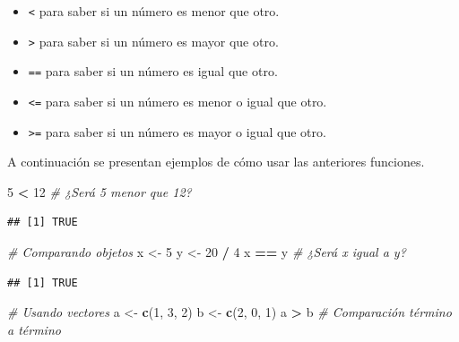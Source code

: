 \documentclass[10pt,]{krantz}
\makeatletter
\newenvironment{Shaded}{\begin{snugshade}}{\end{snugshade}}
\newcommand{\KeywordTok}[1]{\textcolor[rgb]{0.13,0.29,0.53}{\textbf{#1}}}
\newcommand{\DecValTok}[1]{\textcolor[rgb]{0.00,0.00,0.81}{#1}}
\newcommand{\StringTok}[1]{\textcolor[rgb]{0.31,0.60,0.02}{#1}}
\newcommand{\CommentTok}[1]{\textcolor[rgb]{0.56,0.35,0.01}{\textit{#1}}}
\newcommand{\OperatorTok}[1]{\textcolor[rgb]{0.81,0.36,0.00}{\textbf{#1}}}
\newcommand{\NormalTok}[1]{#1}
\providecommand{\tightlist}{%
  \setlength{\itemsep}{0pt}\setlength{\parskip}{0pt}}
\newenvironment{kframe}{%
\medskip{}
\setlength{\fboxsep}{.8em}
 \def\at@end@of@kframe{}%
 \ifinner\ifhmode%
  \def\at@end@of@kframe{\end{minipage}}%
  \begin{minipage}{\columnwidth}%
 \fi\fi%
 \def\FrameCommand##1{\hskip\@totalleftmargin \hskip-\fboxsep
 \colorbox{shadecolor}{##1}\hskip-\fboxsep
     \hskip-\linewidth \hskip-\@totalleftmargin \hskip\columnwidth}%
 \MakeFramed {\advance\hsize-\width
   \@totalleftmargin\z@ \linewidth\hsize
   \@setminipage}}%
 {\par\unskip\endMakeFramed%
 \at@end@of@kframe}
\renewenvironment{Shaded}{\begin{kframe}}{\end{kframe}}
\makeatother
\begin{document}
\begin{itemize}
\tightlist
\item
  \texttt{\textless{}} para saber si un número es menor que otro.
\item
  \texttt{\textgreater{}} para saber si un número es mayor que otro.
\item
  \texttt{==} para saber si un número es igual que otro.
\item
  \texttt{\textless{}=} para saber si un número es menor o igual que
  otro.
\item
  \texttt{\textgreater{}=} para saber si un número es mayor o igual que
  otro.
\end{itemize}

A continuación se presentan ejemplos de cómo usar las anteriores
funciones.

\begin{Shaded}
\begin{Highlighting}[]
\DecValTok{5} \OperatorTok{<}\StringTok{ }\DecValTok{12}  \CommentTok{# ¿Será 5 menor que 12?}
\end{Highlighting}
\end{Shaded}

\begin{verbatim}
## [1] TRUE
\end{verbatim}

\begin{Shaded}
\begin{Highlighting}[]
\CommentTok{# Comparando objetos}
\NormalTok{x <-}\StringTok{ }\DecValTok{5}
\NormalTok{y <-}\StringTok{ }\DecValTok{20} \OperatorTok{/}\StringTok{ }\DecValTok{4}
\NormalTok{x }\OperatorTok{==}\StringTok{ }\NormalTok{y  }\CommentTok{# ¿Será x igual a y?}
\end{Highlighting}
\end{Shaded}

\begin{verbatim}
## [1] TRUE
\end{verbatim}

\begin{Shaded}
\begin{Highlighting}[]
\CommentTok{# Usando vectores}
\NormalTok{a <-}\StringTok{ }\KeywordTok{c}\NormalTok{(}\DecValTok{1}\NormalTok{, }\DecValTok{3}\NormalTok{, }\DecValTok{2}\NormalTok{)}
\NormalTok{b <-}\StringTok{ }\KeywordTok{c}\NormalTok{(}\DecValTok{2}\NormalTok{, }\DecValTok{0}\NormalTok{, }\DecValTok{1}\NormalTok{)}
\NormalTok{a }\OperatorTok{>}\StringTok{ }\NormalTok{b  }\CommentTok{# Comparación término a término}
\end{Highlighting}
\end{Shaded}
\end{document}
